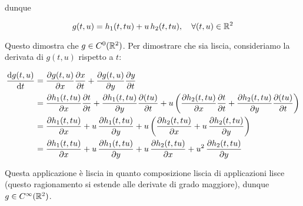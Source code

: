 {dunque

\begin{equation}
	g(t,u) = h_{1}(t,tu) + u \, h_{2}(t,tu) \qcomma \forall (t,u) \in \R^{2}
\end{equation}

Questo dimostra che $ g \in C^{0}(\mathbb{R}^{2}) $. Per dimostrare che sia liscia, consideriamo la derivata di $ g(t,u) $ rispetto a $ t $:

\begin{align}
	\begin{split}
		\dv{g(t,u)}{t} &= \pdv{g(t,u)}{x} \pdv{x}{t} + \pdv{g(t,u)}{y} \pdv{y}{t} \\
		&= \pdv{h_{1}(t,tu)}{x} \pdv{t}{t} + \pdv{h_{1}(t,tu)}{y} \pdv{(tu)}{t} + u \left( \pdv{h_{2}(t,tu)}{x} \pdv{t}{t} + \pdv{h_{2}(t,tu)}{y} \pdv{(tu)}{t} \right) \\
		&= \pdv{h_{1}(t,tu)}{x} + u \, \pdv{h_{1}(t,tu)}{y} + u \left( \pdv{h_{2}(t,tu)}{x} + u \, \pdv{h_{2}(t,tu)}{y} \right)\\
		&= \pdv{h_{1}(t,tu)}{x} + u \, \pdv{h_{1}(t,tu)}{y} + u \, \pdv{h_{2}(t,tu)}{x} + u^{2} \, \pdv{h_{2}(t,tu)}{y}
	\end{split}
\end{align}

Questa applicazione è liscia in quanto composizione liscia di applicazioni lisce (questo ragionamento si estende alle derivate di grado maggiore), dunque $ g \in C^{\infty}(\mathbb{R}^{2}) $.
}


